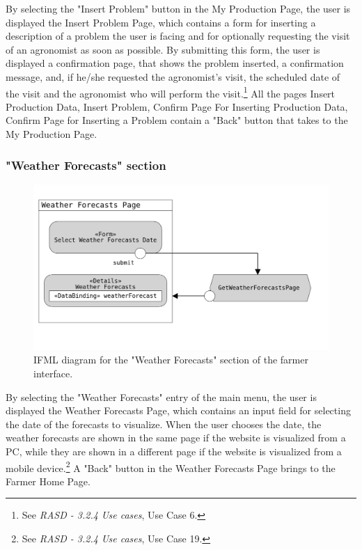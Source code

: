 \documentclass{article}
\begin{document}
By selecting the "Insert Problem" button in the My Production Page, the user is displayed the Insert Problem Page, which contains a form for inserting a description of a problem the user is facing and for optionally requesting the visit of an agronomist as soon as possible. By submitting this form, the user is displayed a confirmation page, that shows the problem inserted, a confirmation message, and, if he/she requested the agronomist's visit, the scheduled date of the visit and the agronomist who will perform the visit.\footnote{See \textit{RASD - 3.2.4 Use cases}, Use Case 6.}\newline
All the pages Insert Production Data, Insert Problem, Confirm Page For Inserting Production Data, Confirm Page for Inserting a Problem contain a "Back" button that takes to the My Production Page.
\vspace{4cm}
\subsubsection{"Weather Forecasts" section}
\begin{figure}[H]
    \centering
     \includegraphics[scale=0.15]{diagrams/ui diagrams/farmer/weather forecasts.png}
    \caption{IFML diagram for the "Weather Forecasts" section of the farmer interface.}
\end{figure}
By selecting the "Weather Forecasts" entry of the main menu, the user is displayed the Weather Forecasts Page, which contains an input field for selecting the date of the forecasts to visualize. When the user chooses the date, the weather forecasts are shown in the same page if the website is visualized from a PC, while they are shown in a different page if the website is visualized from a mobile device.\footnote{See \textit{RASD - 3.2.4 Use cases}, Use Case 19.}\newline
A "Back" button in the Weather Forecasts Page brings to the Farmer Home Page.
\end{document}
